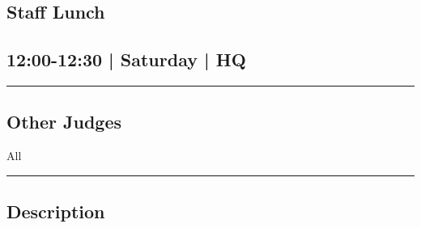 \documentclass[10pt, A5]{article}
\begin{document}
		\begin{framed}
			\begin{minipage}{\textwidth}

			\setcounter{section}{24}
							\section{Staff Lunch}
						
			\subsection*{12:00-12:30 | Saturday | HQ}

			\vspace{0.25cm}
			\hrule
			\vspace{0.25cm}


			\subsection*{Other Judges}
							All

					\vspace{0.25cm}
			\hrule
			\vspace{0.25cm}

			\begin{minipage}{\textwidth}
			\subsection*{\faListAlt \: Description}
			
			\end{minipage}


	\end{minipage}
	\end{framed}

	
\end{document}

